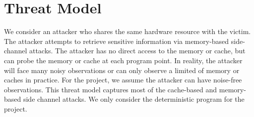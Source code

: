 \section{Threat Model}
We consider an attacker who shares the same hardware resource with the victim. 
The attacker attempts to retrieve sensitive information via memory-based side-channel attacks. 
The attacker has no direct access to the memory or cache, but can probe the memory 
or cache at each program point. In reality, the attacker will face many 
noisy observations or can only observe a limited of memory or caches in practice. 
For the project, we assume the attacker can have noise-free observations. 
This threat model captures most of the cache-based and memory-based side channel attacks.
We only consider the deterministic program for the project.
